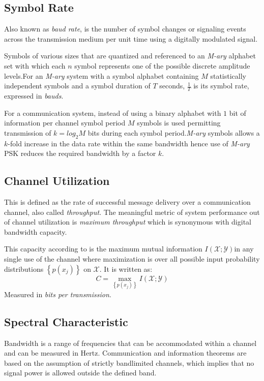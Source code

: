 \subsection*{Symbol Rate}
Also known as \textit{baud rate}, is the number of symbol changes or signaling events across the transmission medium per unit time using a digitally modulated signal.

Symbols of various sizes that are quantized and referenced to an \textit{M-ary} alphabet set
with which each $n$ symbol represents one of the possible discrete amplitude levels.For an \textit{M-ary} system with a symbol alphabet containing $M$ statistically independent symbols and a symbol duration of $T$ seconds, $\frac{1}{T}$ is its symbol rate, expressed in \textit{bauds}\cite{hayk}.

For a communication system, instead of using a binary alphabet with $1$ bit of information per channel symbol period $M$ symbols is
used permitting transmission of $k=log_{2}M$ bits during each symbol period.\textit{M-ary}
symbols allows a $k$-fold increase in the data rate within the same bandwidth hence
use of \textit{M-ary} PSK reduces the required bandwidth by a factor $k$.\cite{AWGN}

\subsection*{Channel Utilization}
This is defined as the rate of successful message delivery over a communication channel, also called \textit{throughput}.
The meaningful metric of system performance out of channel utilization is \textit{maximum throughput} which is synonymous with digital bandwidth capacity.

This capacity according to \cite{hayk} is the maximum mutual information $I\left( \mathscr{X;Y} \right)$in any single use of the channel where maximization is over all possible input probability distributions $\left\{ p\left( x_j\right) \right\}$ on $\mathscr{X}$. It is written as: 
$$C = \underset{\left\{ p\left( x_j\right) \right\}}{\max} I\left( \mathscr{X;Y} \right)$$
Measured in \textit{bits per transmission}.

\subsection*{Spectral Characteristic}
Bandwidth is a range of frequencies that can be accommodated within a channel and can be measured in Hertz. Communication and information theorems are based on the assumption of strictly
bandlimited channels, which implies that no signal power is allowed outside the defined band.


